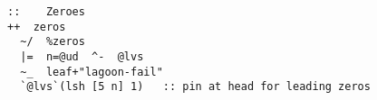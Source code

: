 \documentclass{article}
\begin{document}
\begin{lstlisting}
::    Zeroes
++  zeros
  ~/  %zeros
  |=  n=@ud  ^-  @lvs
  ~_  leaf+"lagoon-fail"
  `@lvs`(lsh [5 n] 1)   :: pin at head for leading zeros
\end{lstlisting}
\end{document}
